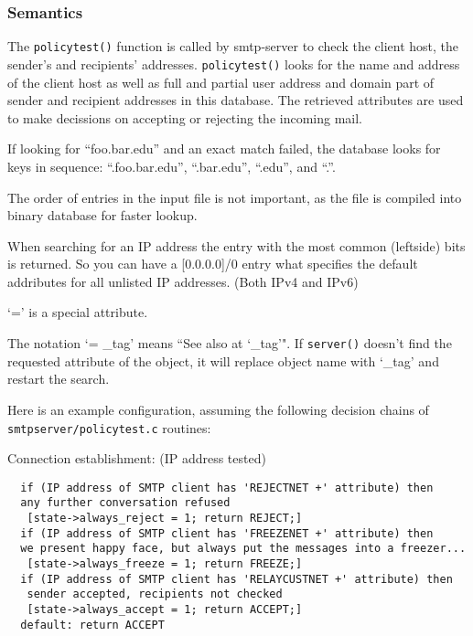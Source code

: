 
\subsubsection{Semantics}



The {\tt policytest()} function is called by smtp-server to check the client 
host, the sender's and recipients' addresses.  {\tt policytest()} looks for 
the name and address of the client host as well as full and partial user address 
and domain part of sender and recipient addresses in this database.  The 
retrieved attributes are used to make decissions on accepting or rejecting 
the incoming mail.

If looking for ``foo.bar.edu'' and an exact match failed, the database looks
for keys in sequence:  ``.foo.bar.edu'', ``.bar.edu'', ``.edu'', and ``.''.

The order of entries in the input file is not important, as the file is
compiled into binary database for faster lookup.

When searching for an IP address the entry with the most common (leftside)
bits is returned.   So you can have a [0.0.0.0]/0 entry what specifies the 
default addributes for all unlisted IP addresses. (Both IPv4 and IPv6)

`=' is a special attribute.

The notation `= \_tag' means ``See also at `\_tag'". If {\tt server()} doesn't 
find the requested attribute of the object, it will replace object name 
with `\_tag' and restart the search.

Here is an example configuration, assuming the following decision 
chains of {\tt smtpserver/policytest.c} routines:

Connection establishment:  (IP address tested)

\begin{verbatim}
  if (IP address of SMTP client has 'REJECTNET +' attribute) then
  any further conversation refused
   [state->always_reject = 1; return REJECT;]
  if (IP address of SMTP client has 'FREEZENET +' attribute) then
  we present happy face, but always put the messages into a freezer...
   [state->always_freeze = 1; return FREEZE;]
  if (IP address of SMTP client has 'RELAYCUSTNET +' attribute) then
   sender accepted, recipients not checked
   [state->always_accept = 1; return ACCEPT;]
  default: return ACCEPT
\end{verbatim}


